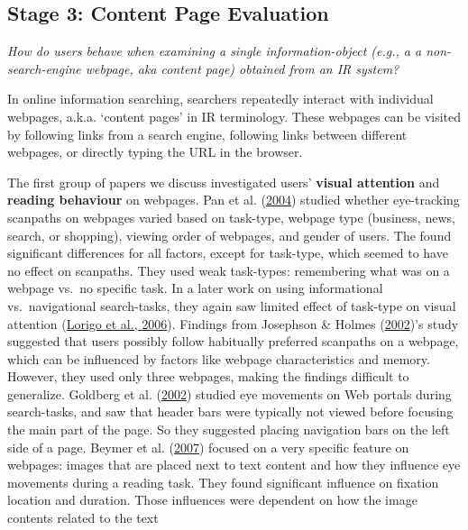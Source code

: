 \documentclass[a4paper, nobind]{templates/ociamthesis}
\begin{document}
\hypertarget{sec:bg_search_content_page}{%
\subsection{Stage 3: Content Page Evaluation}\label{sec:bg_search_content_page}}

\emph{How do users behave when examining a single information-object (e.g., a
a non-search-engine webpage, aka content page) obtained from an IR
system?}

In online information searching, searchers repeatedly interact with
individual webpages, a.k.a. `content pages' in IR terminology. These
webpages can be visited by following links from a search engine,
following links between different webpages, or directly typing the URL
in the browser.

The first group of papers we discuss investigated users' \textbf{visual
attention} and \textbf{reading behaviour} on webpages. Pan et al. (\protect\hyperlink{ref-pan2004determinants}{2004})
studied whether eye-tracking scanpaths on webpages varied based on
task-type, webpage type (business, news, search, or shopping), viewing
order of webpages, and gender of users. The found significant
differences for all factors, except for task-type, which seemed to have
no effect on scanpaths. They used weak task-types: remembering what was
on a webpage vs.~no specific task. In a later work on using
informational vs.~navigational search-tasks, they again saw limited
effect of task-type on visual attention (\protect\hyperlink{ref-lorigo2006influence}{Lorigo et al., 2006}). Findings
from Josephson \& Holmes (\protect\hyperlink{ref-josephson2002visual}{2002})'s study suggested that users possibly follow
habitually preferred scanpaths on a webpage, which can be influenced by
factors like webpage characteristics and memory. However, they used only
three webpages, making the findings difficult to generalize.
Goldberg et al. (\protect\hyperlink{ref-goldberg2002eye}{2002}) studied eye movements on Web portals during
search-tasks, and saw that header bars were typically not viewed before
focusing the main part of the page. So they suggested placing navigation
bars on the left side of a page. Beymer et al. (\protect\hyperlink{ref-beymer2007eye}{2007}) focused on a very
specific feature on webpages: images that are placed next to text
content and how they influence eye movements during a reading task. They
found significant influence on fixation location and duration. Those
influences were dependent on how the image contents related to the text
\end{document}
